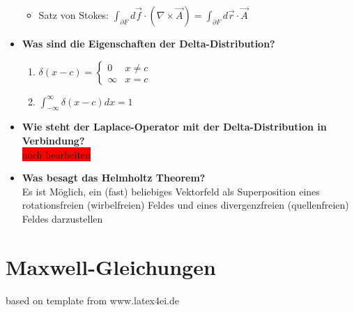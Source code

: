 \documentclass[german]{latex4ei/latex4ei_sheet}
\begin{document}
\begin{sectionbox}
\begin{itemize}
\begin{itemize}
				\item Satz von Stokes: $\int_{\partial F}d\vec{f}\cdot(\nabla\times\vec{A})=\int_{\partial F}d\vec{r}\cdot\vec{A}$
			\end{itemize}
		\item \textbf{Was sind die Eigenschaften der Delta-Distribution?}
			\begin{enumerate}
				\item $\delta(x-c)=
				\begin{cases}
					0 & x\neq c\\
					\infty & x=c
				\end{cases}$	
				\item $\int_{-\infty}^\infty\delta(x-c)dx=1$
			\end{enumerate}
		\item \textbf{Wie steht der Laplace-Operator mit der Delta-Distribution in Verbindung?}
		\\\colorbox{red}{noch bearbeiten}
		\item \textbf{Was besagt das Helmholtz Theorem?}\\
			Es ist Möglich, ein (fast) beliebiges Vektorfeld als Superposition eines rotationsfreien (wirbelfreien) Feldes und eines divergenzfreien (quellenfreien) Feldes darzustellen
\end{itemize}	
\end{sectionbox}
\section{Maxwell-Gleichungen}
\tiny{based on template from www.latex4ei.de}
\end{document}
